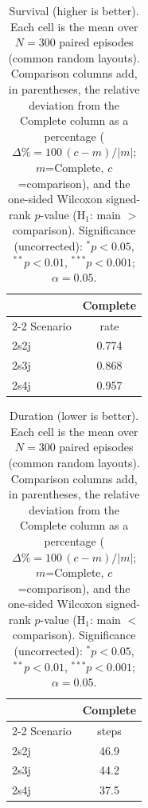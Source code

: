 \begin{table}[ht]
  \centering
  \caption{Survival (higher is better). Each cell is the mean over $N=300$ paired episodes (common random layouts). Comparison columns add, in parentheses, the relative deviation from the Complete column as a percentage ($\Delta\%=100\,(c-m)/|m|$; $m$=Complete, $c$=comparison), and the one-sided Wilcoxon signed-rank $p$-value (H$_1$: main $>$ comparison). Significance (uncorrected): $^{*}p<0.05$, $^{**}p<0.01$, $^{***}p<0.001$; $\alpha=0.05$.}
  \label{tab:wilcoxon-survival}
  \small
  \begin{tabular}{l c}
    \toprule
     & Complete \\
    \cmidrule(lr){2-2}
    Scenario & {rate} \\
    \midrule
    2s2j & 0.774 \\
    2s3j & 0.868 \\
    2s4j & 0.957 \\
    \bottomrule
  \end{tabular}
\end{table}

\begin{table}[ht]
  \centering
  \caption{Duration (lower is better). Each cell is the mean over $N=300$ paired episodes (common random layouts). Comparison columns add, in parentheses, the relative deviation from the Complete column as a percentage ($\Delta\%=100\,(c-m)/|m|$; $m$=Complete, $c$=comparison), and the one-sided Wilcoxon signed-rank $p$-value (H$_1$: main $<$ comparison). Significance (uncorrected): $^{*}p<0.05$, $^{**}p<0.01$, $^{***}p<0.001$; $\alpha=0.05$.}
  \label{tab:wilcoxon-duration}
  \small
  \begin{tabular}{l c}
    \toprule
     & Complete \\
    \cmidrule(lr){2-2}
    Scenario & {steps} \\
    \midrule
    2s2j & 46.9 \\
    2s3j & 44.2 \\
    2s4j & 37.5 \\
    \bottomrule
  \end{tabular}
\end{table}


